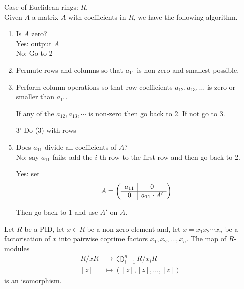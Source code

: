 \documentclass[12pt, a4paper]{article}
\begin{document}
\begin{mdexample}
    Case of Euclidean rings: \( R \).\\
    Given \( A \) a matrix \( A \) with coefficients in \( R \), we have the following algorithm.

\begin{enumerate}
  \item Is \( A \) zero? \\
  Yes: output \( A \) \\
  No: Go to 2
  
  \item Permute rows and columns so that \( a_{11} \) is non-zero and smallest possible.
  
  \item Perform column operations so that row coefficients \( a_{12}, a_{13}, \ldots \) is zero or smaller than \( a_{11} \).
  
  If any of the \( a_{12},a_{13},\cdots \) is non-zero then go back to 2. If not go to 3.
  
  \item[3'] Do (3) with rows
  
  \item Does \( a_{11} \) divide all coefficients of \( A \)? \\
  No: say \( a_{11} \) fails; add the \( i \)-th row to the first row and then go back to 2.
  
  Yes: set
  \[
A = \left(
  \begin{array}{c|c}
  a_{11} & \multicolumn{1}{c}{0} \\
  \hline
  \multicolumn{1}{c|}{0} & a_{11}\cdot A'
  \end{array}
\right)
\]

  
  Then go back to 1 and use \( A' \) on \( A \).
\end{enumerate}
\end{mdexample}

\begin{mdthm}
    Let \(R\) be a PID, let \(x\in R\) be a non-zero element and, let \(x=x_1x_2\cdots x_n\) be a factorisation of \(x\) into pairwise coprime factors \(x_1,x_2,\ldots,x_n\). The map of \(R\)-modules 
    \[\begin{aligned}
        R/xR &\to \bigoplus_{i=1}^n R/x_iR \\
        [z]&\mapsto \left( [z],[z],\ldots,[z] \right)
    \end{aligned}\]
    is an isomorphism.
\end{mdthm}
\end{document}
